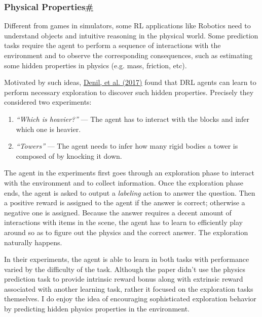 \subsubsection{\texorpdfstring{Physical Properties\hyperref[physical-properties]{\#}}{Physical Properties\#}}\label{physical-properties}

Different from games in simulators, some RL applications like Robotics need to understand objects and intuitive reasoning in the physical world. Some prediction tasks require the agent to perform a sequence of interactions with the environment and to observe the corresponding consequences, such as estimating some hidden properties in physics (e.g. mass, friction, etc).

Motivated by such ideas, \href{https://arxiv.org/abs/1611.01843}{Denil, et al. (2017)} found that DRL agents can learn to perform necessary exploration to discover such hidden properties. Precisely they considered two experiments:

\begin{enumerate}
\tightlist
\item
  \emph{``Which is heavier?''} --- The agent has to interact with the blocks and infer which one is heavier.
\item
  \emph{``Towers''} --- The agent needs to infer how many rigid bodies a tower is composed of by knocking it down.
\end{enumerate}

The agent in the experiments first goes through an exploration phase to interact with the environment and to collect information. Once the exploration phase ends, the agent is asked to output a \emph{labeling} action to answer the question. Then a positive reward is assigned to the agent if the answer is correct; otherwise a negative one is assigned. Because the answer requires a decent amount of interactions with items in the scene, the agent has to learn to efficiently play around so as to figure out the physics and the correct answer. The exploration naturally happens.

In their experiments, the agent is able to learn in both tasks with performance varied by the difficulty of the task. Although the paper didn't use the physics prediction task to provide intrinsic reward bonus along with extrinsic reward associated with another learning task, rather it focused on the exploration tasks themselves. I do enjoy the idea of encouraging sophisticated exploration behavior by predicting hidden physics properties in the environment.

